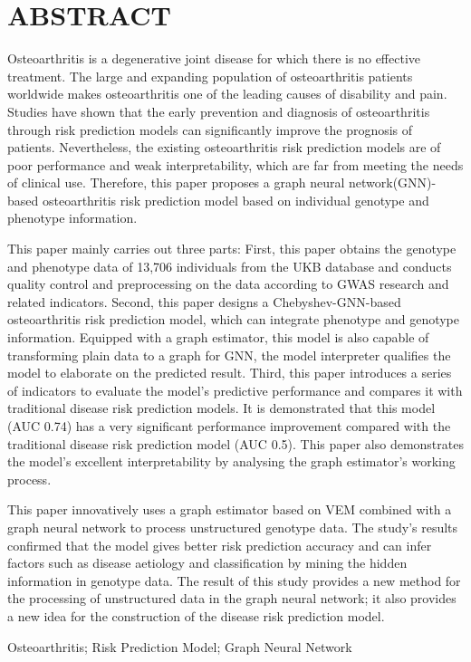 \titlespacing{\chapter}{0pt}{0mm}{5mm}
\chapter*{ABSTRACT}

Osteoarthritis is a degenerative joint disease for which there is no effective treatment. The large and expanding population of osteoarthritis patients worldwide makes osteoarthritis one of the leading causes of disability and pain. Studies have shown that the early prevention and diagnosis of osteoarthritis through risk prediction models can significantly improve the prognosis of patients. Nevertheless, the existing osteoarthritis risk prediction models are of poor performance and weak interpretability, which are far from meeting the needs of clinical use. Therefore, this paper proposes a graph neural network(GNN)-based osteoarthritis risk prediction model based on individual genotype and phenotype information.



This paper mainly carries out three parts: First, this paper obtains the genotype and phenotype data of 13,706 individuals from the UKB database and conducts quality control and preprocessing on the data according to GWAS research and related indicators. 
Second, this paper designs a Chebyshev-GNN-based osteoarthritis risk prediction model, which can integrate phenotype and genotype information. Equipped with a graph estimator, this model is 
also capable of transforming plain data to a graph for GNN, the model interpreter qualifies the model to elaborate on the predicted result. 
Third, this paper introduces a series of indicators to evaluate the model's predictive performance and compares it with traditional disease risk prediction models. It is demonstrated that this model (AUC 0.74) has a very significant performance improvement compared with the traditional disease risk prediction model (AUC 0.5). This paper also demonstrates the model's excellent interpretability by analysing the graph estimator's working process.



This paper innovatively uses a graph estimator based on VEM combined with a graph neural network to process unstructured genotype data. The study's results confirmed that the model gives better risk prediction accuracy and can infer factors such as disease aetiology and classification by mining the hidden information in genotype data. The result of this study provides a new method for the processing of unstructured data in the graph neural network; it also provides a new idea for the construction of the disease risk prediction model.

\vspace{\baselineskip}
 Osteoarthritis; Risk Prediction Model; Graph Neural Network


\titlespacing{\chapter}{0pt}{-6mm}{5mm}
\clearpage{\pagestyle{empty}\cleardoublepage}
